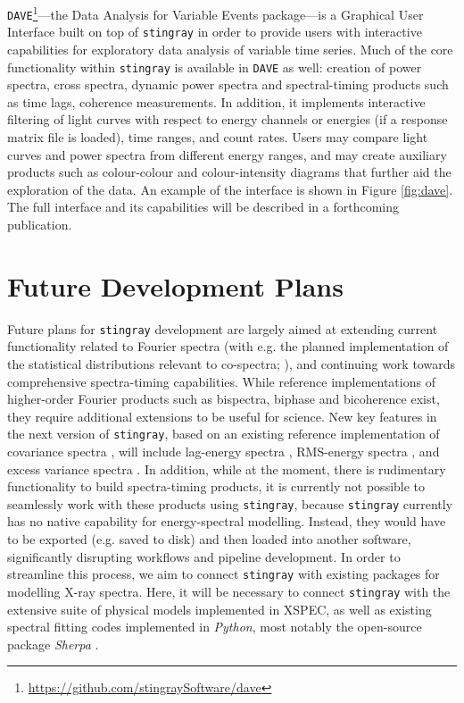 \documentclass[twocolumn]{aastex62}
\newcommand{\stingray}{\texttt{stingray}\xspace}
\newcommand{\dave}{\texttt{DAVE}\xspace}
\begin{document}
\dave\footnote{\url{https://github.com/stingraySoftware/dave}}---the Data Analysis for Variable Events package---is a Graphical User Interface built on top of \stingray in order to provide users with interactive capabilities for exploratory data analysis of variable time series. Much of the core functionality within \stingray is available in \dave as well: creation of power spectra, cross spectra, dynamic power spectra and spectral-timing products such as time lags, coherence measurements. In addition, it implements interactive filtering of light curves with respect to energy channels or energies (if a response matrix file is loaded), time ranges, and count rates. Users may compare light curves and power spectra from different energy ranges, and may create auxiliary products such as colour-colour and colour-intensity diagrams that further aid the exploration of the data. An example of the interface is shown in Figure \ref{fig:dave}. The full interface and its capabilities will be described in a forthcoming publication. 



\section{Future Development Plans}
\label{sec:future}

Future plans for \stingray development are largely aimed at extending current functionality related to Fourier spectra (with e.g. the planned implementation of the statistical distributions relevant to co-spectra; \citealt{huppenkothen2017}), and continuing work towards comprehensive spectra-timing capabilities. While reference implementations of higher-order Fourier products such as bispectra, biphase and bicoherence \citep{maccarone2005,maccarone2013} exist, they require additional extensions to be useful for science. New key features in the next version of \stingray, based on an existing reference implementation of covariance spectra \citep{WilkinsonUttley09}, will include lag-energy spectra \citep{Vaughanetal94}, RMS-energy spectra \citep{Revnivtsevetal99}, and excess variance spectra \citep{Vaughanetal03}. In addition, while at the moment, there is rudimentary functionality to build spectra-timing products, it is currently not possible to seamlessly work with these products using \stingray, because \stingray currently has no native capability for energy-spectral modelling. Instead, they would have to be exported (e.g. saved to disk) and then loaded into another software, significantly disrupting workflows and pipeline development. In order to streamline this process, we aim to connect \stingray with existing packages for modelling X-ray spectra. Here, it will be necessary to connect \stingray with the extensive suite of physical models implemented in XSPEC, as well as existing spectral fitting codes implemented in \textit{Python}, most notably the open-source package \textit{Sherpa} \citep{sherpa}.
\end{document}
